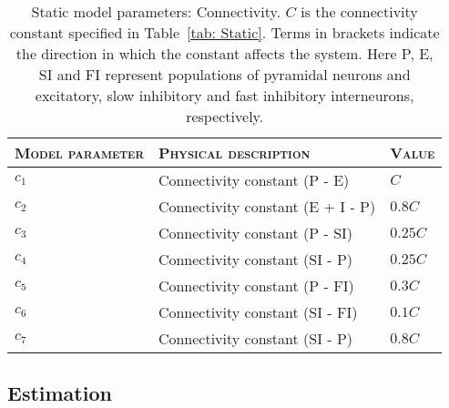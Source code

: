 \begin{center}
	\begin{table}
			\caption[Static Model Parameters: Connectivity]{Static model parameters: Connectivity. $C$ is the connectivity constant specified in Table~\ref{tab: Static}. Terms in brackets indicate the direction in which the constant affects the system. Here P, E, SI and FI represent populations of pyramidal neurons and excitatory, slow inhibitory and fast inhibitory interneurons, respectively.}
		\begin{tabular}{||p{4cm}|p{7cm}|p{2cm}||}\hline
			 \textsc{Model parameter}  & \textsc{Physical description} & \textsc{Value}
			   \\\hline\hline
			 $c_{1}$ & Connectivity constant (P - E) & $C$ \\\hline
			 $c_{2}$ & Connectivity constant (E + I - P) & $0.8C$ \\\hline
			 $c_{3}$ & Connectivity constant (P - SI) & $0.25C$  \\\hline
			 $c_{4}$ & Connectivity constant (SI - P)& $0.25C$ \\\hline
			 $c_{5}$ & Connectivity constant (P - FI) & $0.3C$ \\\hline
			 $c_{6}$ & Connectivity constant (SI - FI) & $0.1C$ \\\hline
			 $c_{7}$ & Connectivity constant (SI - P) & $0.8C$ \\\hline\hline
		\end{tabular}
		\label{tab: Connectivity}
	\end{table}
\end{center}

\subsection{Estimation}

